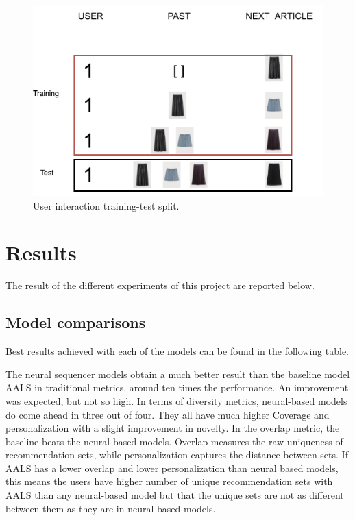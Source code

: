 \documentclass{tex_files/kththesis}
\begin{document}
\begin{figure}[H]
    \centering
    \includegraphics[scale=0.45]{images/dataset/datasetsplit.png}
    \caption{User interaction training-test split.}
\end{figure}

\section{Results}
The result of the different experiments of this project are reported below.

\subsection{Model comparisons}
Best results achieved with each of the models can be found in the following table.

\begin{center}

\end{center}

The neural sequencer models obtain a much better result than the baseline model AALS in traditional metrics, around ten times the performance. An improvement was expected, but not so high. In terms of diversity metrics, neural-based models do come ahead in three out of four. They all have much higher Coverage and personalization with a slight improvement in novelty. In the overlap metric, the baseline beats the neural-based models. Overlap measures the raw uniqueness of recommendation sets, while personalization captures the distance between sets. If AALS has a lower overlap and lower personalization than neural based models, this means the users have higher number of unique recommendation sets with AALS than any neural-based model but that the unique sets are not as different between them as they are in neural-based models. 
\end{document}
